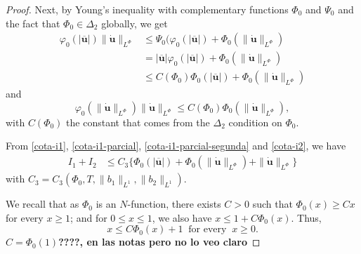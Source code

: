 \documentclass[twoside]{article}
\theoremstyle{remark}
\newcommand{\orlnor}{\|_{L^{\Phi}}}
\renewcommand{\b}[1]{\boldsymbol{#1}}
\renewcommand{\leq}{\leqslant}
\begin{document}
\begin{proof}
Next, by Young's inequality with complementary functions $\Phi_0$ and $\Psi_0$ and the fact that 
$\Phi_0 \in \Delta_2$ globally, we get
\begin{equation}\label{cota-i1-parcial}
 \begin{split}
\varphi_0(|\b{\overline{u}}|) \|\b{\dot{u}}\orlnor
&\leq 
\Psi_0(\varphi_0(|\b{\overline{u}}|)+
\Phi_0(\|\b{\dot{u}}\orlnor)
\\
&=
|\b{\overline{u}}|\varphi_0(|\b{\overline{u}}|)
+\Phi_0(\|\b{\dot{u}}\orlnor)
\\
&\leq C(\Phi_0)
\Phi_0(|\b{\overline{u}}|)
+\Phi_0(\|\b{\dot{u}}\orlnor)
\end{split}
\end{equation}
and 
\begin{equation}\label{cota-i1-parcial-segunda}
\varphi_0(\|\b{\dot u}\orlnor) \|\b{\dot u}\orlnor
\leq 
C(\Phi_0) \Phi_0(\|\b{\dot u}\orlnor),
\end{equation}
with $C(\Phi_0)$ the constant that comes from the $\Delta_2$ condition on $\Phi_0$.

From \eqref{cota-i1}, \eqref{cota-i1-parcial}, \eqref{cota-i1-parcial-segunda} and \eqref{cota-i2},
we have
\begin{equation}\label{cota-i1-i2}
\begin{split}
I_1+I_2
&
\leq C_3
\bigg\{ 
\Phi_0(|\b{\overline{u}}|)
+\Phi_0(\|\b{\dot{u}}\orlnor)
+\|\b{\dot{u}}\orlnor
\bigg\}
\end{split}
\end{equation}
with $C_3= C_3(\Phi_0,T, \|b_1\|_{L^1}, \|b_2\|_{L^1} )$.


We recall that as $\Phi_0$ is an $N$-function, there exists $C>0$ such that $\Phi_0(x)\geq Cx$ for every $x\geq 1$; and for $0\leq x \leq 1$, we also have $x\leq 1+C\Phi_0(x)$. 
Thus, 
\begin{equation}\label{x-cota-phi0}
x\leq C\Phi_0(x)+1\;\;\mbox{for every}\;\;x\geq 0.
\end{equation}
{\bf $C=\Phi_0(1)$????, en las notas pero no lo veo claro}



\end{proof}
\end{document}
